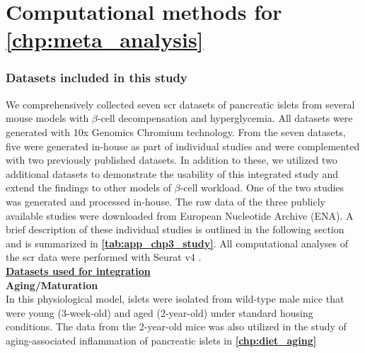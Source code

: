 \clearpage


    


\section{Computational methods for \autoref{chp:meta_analysis}}
\label{sec:chp3_methods}

\subsubsection{\large Datasets included in this study}

We comprehensively collected seven \gls{scr} datasets of pancreatic islets from several mouse models with $\beta$-cell decompensation and hyperglycemia. All datasets were generated with 10x Genomics Chromium technology. From the seven datasets, five were generated in-house as part of individual studies and were complemented with two previously published datasets. In addition to these, we utilized two additional datasets to demonstrate the usability of this integrated study and extend the findings to other models of $\beta$-cell workload. One of the two studies was generated and processed in-house. The raw data of the three publicly available studies were downloaded from European Nucleotide Archive (ENA). A brief description of these individual studies is outlined in the following section and is summarized in \textbf{\autoref{tab:app_chp3_study}}. All computational analyses of the \gls{scr} data were performed with Seurat v4 \textbf{\cite{hao_integrated_2021}}.\\


\underline{\normalsize \textbf{Datasets used for integration}}\\


\textbf{Aging/Maturation\\}
In this physiological model, islets were isolated from wild-type male mice that were young (3-week-old) and aged (2-year-old) under standard housing conditions. The data from the 2-year-old mice was also utilized in the study of aging-associated inflammation of pancreatic islets in \textbf{\autoref{chp:diet_aging}}\\

